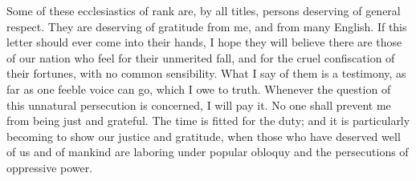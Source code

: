 Some of these ecclesiastics of rank are, by all titles, persons deserving of general respect. They are deserving of gratitude from me, and from many English. If this letter should ever come into their hands, I hope they will believe there are those of our nation who feel for their unmerited fall, and for the cruel confiscation of their fortunes, with no common sensibility. What I say of them is a testimony, as far as one feeble voice can go, which I owe to truth. Whenever the question of this unnatural persecution is concerned, I will pay it. No one shall prevent me from being just and grateful. The time is fitted for the duty; and it is particularly becoming to show our justice and gratitude, when those who have deserved well of us and of mankind are laboring under popular obloquy and the persecutions of oppressive power.

